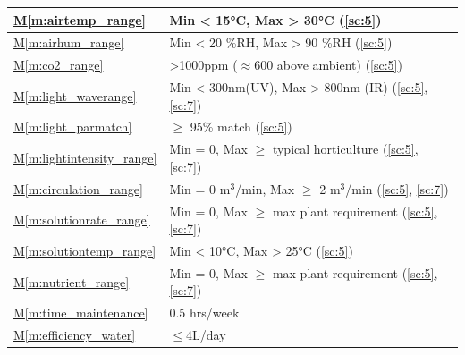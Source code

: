 \documentclass{../tex/report}
\newcommand{\mref}[1]{\hyperref[#1]{M\ref{#1}}}
\begin{document}
\begin{tabular}{|l|p{14.35cm}|}
    \mref{m:airtemp_range}          & Min < 15°C, Max > 30°C                                            \hfill (\ref{sc:5})                                     \\ \hline %
    \mref{m:airhum_range}           & Min < 20 \%RH, Max > 90 \%RH                                      \hfill (\ref{sc:5})                                     \\ \hline %
    \mref{m:co2_range}              & >1000ppm ($\approx$600 above ambient)                             \hfill (\ref{sc:5})                                     \\ \hline
    \mref{m:light_waverange}        & Min < 300nm\footnotemark[6] (UV), Max > 800nm (IR)                \hfill (\ref{sc:5}, \ref{sc:7}) \cite{uvc-disinfection} \\ \hline %
    \mref{m:light_parmatch}         & $\ge$ 95\% match                                                  \hfill (\ref{sc:5})                                     \\ \hline %
    \mref{m:lightintensity_range}   & Min = 0, Max $\ge$ typical horticulture                           \hfill (\ref{sc:5}, \ref{sc:7})                         \\ \hline %
    \mref{m:circulation_range}      & Min = 0 m${}^3$/min, Max $\ge$ 2 m${}^3$/min                      \hfill (\ref{sc:5}, \ref{sc:7})                         \\ \hline
    \mref{m:solutionrate_range}     & Min = 0, Max $\ge$ max plant requirement                          \hfill (\ref{sc:5}, \ref{sc:7})                         \\ \hline %
    \mref{m:solutiontemp_range}     & Min < 10°C, Max > 25°C                                            \hfill (\ref{sc:5})                                     \\ \hline %
    \mref{m:nutrient_range}         & Min = 0, Max $\ge$ max plant requirement                          \hfill (\ref{sc:5}, \ref{sc:7})                         \\ \hline %
    \mref{m:time_maintenance}       & 0.5 hrs/week                                                      \hfill \cite{dsfc-phase2}                               \\ \hline
    \mref{m:efficiency_water}       & $\le$4L/day                                                       \hfill \cite{dsfc-phase2}                               \\ \hline

\end{tabular}
\end{document}
